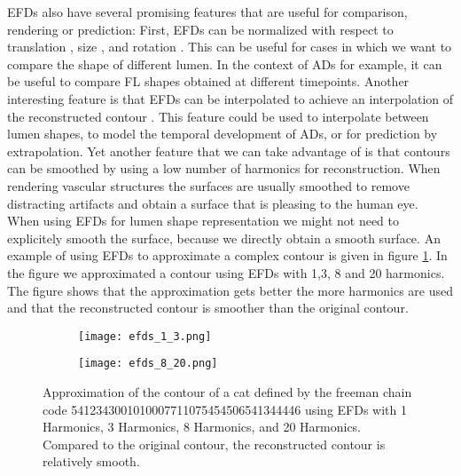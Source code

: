 \documentclass[thesis.tex]{subfiles}
\begin{document}
EFDs also have several promising features that are useful for comparison, rendering or prediction: First, EFDs can be normalized with respect to translation \cite{giardinia}, size \cite{giardinia}, and rotation \cite{lin1987new, giardinia}. This can be useful for cases in which we want to compare the shape of different lumen. In the context of ADs for example, it can be useful to compare FL shapes obtained at different timepoints. Another interesting feature is that EFDs can be interpolated to achieve an interpolation of the reconstructed contour \cite{jeong2007reslicing}. This feature could be used to interpolate between lumen shapes, to model the temporal development of ADs, or for prediction by extrapolation.  Yet another feature that we can take advantage of is that contours can be smoothed by using a low number of harmonics for reconstruction. When rendering vascular structures the surfaces are usually smoothed to remove distracting artifacts and obtain a surface that is pleasing to the human eye. When using EFDs for lumen shape representation we might not need to explicitely smooth the surface, because we directly obtain a smooth surface. 
An example of using EFDs to approximate a complex contour is given in figure \ref{fig:efd_approx}. In the figure we approximated a contour using EFDs with 1,3, 8 and 20 harmonics. The figure shows that the approximation gets better the more harmonics are used and that the reconstructed contour is smoother than the original contour.

\begin{figure}
	\begin{subfigure}[t]{\textwidth}
		\texttt{[image: efds\_1\_3.png]}		
	\end{subfigure}
	\begin{subfigure}[t]{\textwidth}
		\texttt{[image: efds\_8\_20.png]}		
	\end{subfigure}
	\caption{Approximation of the contour of a cat defined by the freeman chain code 5412343001010007711075454506541344446 using EFDs with 1 Harmonics, 3 Harmonics, 8 Harmonics, and 20 Harmonics. Compared to the original contour, the reconstructed contour is relatively smooth.}
\label{fig:efd_approx}
\end{figure}
\end{document}
